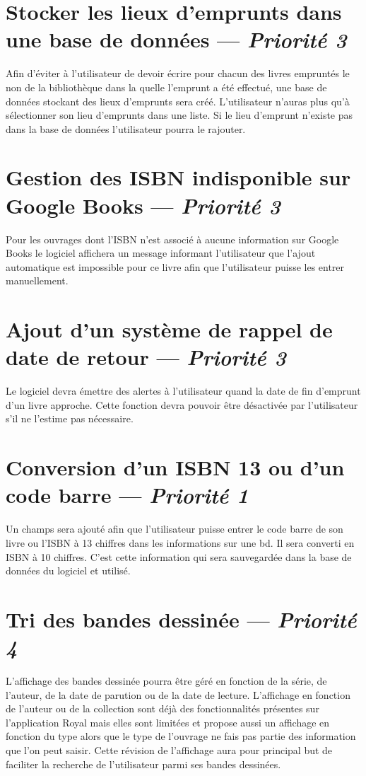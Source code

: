 \section[Stocker les lieux d'emprunts dans une base de données]{Stocker les lieux d'emprunts dans une base de données — \emph{Priorité 3}}
Afin d'éviter à l'utilisateur de devoir écrire pour chacun des livres empruntés le non de la bibliothèque dans la quelle l'emprunt a été effectué, une base de données stockant des lieux d'emprunts sera créé. 
L'utilisateur n'auras plus qu'à sélectionner son lieu d'emprunts dans une liste. 
Si le lieu d'emprunt n'existe pas dans la base de données l'utilisateur pourra le rajouter.

\section[Gestion des ISBN indisponible sur Google Books]{Gestion des ISBN indisponible sur Google Books — \emph{Priorité 3}}
Pour les ouvrages dont l'ISBN n'est associé à aucune information sur Google Books le logiciel affichera un message informant l'utilisateur que l'ajout automatique est impossible pour ce livre afin que l'utilisateur puisse les entrer manuellement.   

\section[Ajout d'un système de rappel de date de retour]{Ajout d'un système de rappel de date de retour — \emph{Priorité 3}}
Le logiciel devra émettre des alertes à l'utilisateur quand la date de fin d'emprunt d'un livre approche. 
Cette fonction devra pouvoir être désactivée par l'utilisateur s'il ne l'estime pas nécessaire.

\section[Conversion d'un ISBN 13 ou code barre]{Conversion d'un ISBN 13 ou d'un code barre — \emph{Priorité 1}}
Un champs sera ajouté afin que l'utilisateur puisse entrer le code barre de son livre ou l'ISBN à 13 chiffres dans les informations sur une bd. Il sera converti en ISBN à 10 chiffres. C'est cette information qui sera sauvegardée dans la base de données du logiciel et utilisé.


\section[Tri des bandes dessinée]{Tri des bandes dessinée — \emph{Priorité 4}}
L'affichage des bandes dessinée pourra être géré en fonction de la série, de l'auteur, de la date de parution ou de la date de lecture. 
L'affichage en fonction de l'auteur ou de la collection sont déjà des fonctionnalités présentes sur l'application Royal mais elles sont limitées et propose aussi un affichage en fonction du type alors que le type de l'ouvrage ne fais pas partie des information que l'on peut saisir. 
Cette révision de l'affichage aura pour principal but de faciliter la recherche de l'utilisateur parmi ses bandes dessinées.

